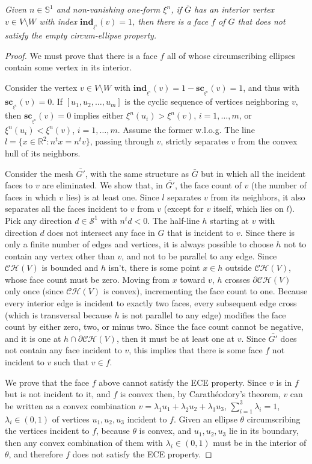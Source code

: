 \documentclass[11pt]{article}
\begin{document}
\emph{
Given $n\in\mathbb{S}^1$ and non-vanishing one-form $\xi^n$, if $\bar{G}$
has an interior vertex $v\in V\setminus W$ with index
$\mathbf{ind}_{_{\xi^n}}(v)=1$, then there is a face $f$ of
$G$ that does not satisfy the empty circum-ellipse property.  
}
\begin{proof}
We must prove that there is a face $f$ all of whose circumscribing ellipses
contain some vertex in its interior. 

Consider the vertex $v\in V\setminus W$ with
$\mathbf{ind}_{_{\xi^n}}(v)=1-\mathbf{sc}_{_{\xi^n}}(v)=1$, and thus
with $\mathbf{sc}_{_{\xi^n}}(v)=0$. If $\left[u_1,u_2,\dots,u_m\right]$ is the cyclic sequence of vertices neighboring
$v$, then 
$\mathbf{sc}_{_{\xi^n}}(v)=0$ implies either $\xi^n(u_i)>\xi^n(v)$, $i=1,\dots,m$, or $\xi^n(u_i)<\xi^n(v)$, $i=1,\dots,m$. 
Assume the former w.l.o.g. The line $l=\{x\in\mathbb{R}^2 : n^t x = n^t v\}$, passing through
$v$, strictly separates $v$ from the convex hull of its neighbors. 

Consider the mesh $\bar{G'}$, with the same structure as $\bar{G}$ but in which all the incident faces to $v$
are eliminated. 
We show that, in $\bar{G'}$, the face count of $v$ (the number of faces in which $v$ lies) is at
least one. 
Since $l$ separates $v$ from its neighbors, it also separates all the faces
incident to $v$ from $v$ (except for $v$ itself, which lies on $l$). 
Pick any direction $d\in\mathcal{S}^1$ with $n^t{d} < 0$. 
The half-line $h$ starting at $v$ with direction $d$ does not intersect any face in $G$ that is incident to $v$. 
Since there is only a finite number of edges and vertices, it is always
possible to choose $h$ not to contain any vertex other than $v$, and not to be parallel to any edge. 
Since $\mathcal{CH}(V)$ is bounded and $h$ isn't, there is
some point $x\in h$ outside $\mathcal{CH}(V)$, whose face count must be zero. 
Moving from $x$ toward $v$, $h$ crosses $\partial\mathcal{CH}(V)$ only once 
(since $\mathcal{CH}(V)$ is convex), incrementing the face count to one. 
Because every interior edge is incident to exactly two faces, 
every subsequent edge cross (which is transversal because $h$ is not
parallel to any edge) modifies the face count by either zero, two, or
minus two. Since the face count cannot be negative, and it is one at 
$h\cap \partial\mathcal{CH}(V)$, then it must be at least one at $v$. 
Since $\bar{G'}$ does not contain any face incident to $v$, 
this implies that there is
some face $f$ not incident to $v$ such that $v\in f$. 

We prove that the face $f$ above cannot satisfy the ECE property. 
Since $v$ is in $f$ but is not incident to it, and $f$ is convex
then, by Carath\'eodory's theorem, $v$ can be written as a 
convex combination $v=\lambda_1 u_1+\lambda_2 u_2+\lambda_3 u_3$,
$\sum_{i=1}^3\lambda_i=1$, $\lambda_i\in(0,1)$ of vertices $u_1,u_2,u_3$
incident to $f$. 
Given an ellipse $\theta$ circumscribing the vertices incident to $f$, 
because $\theta$ is convex, and $u_1,u_2,u_3$ lie in its boundary, 
then any convex combination of them with $\lambda_i\in(0,1)$ must be in the
interior of $\theta$, and therefore $f$ does not satisfy the ECE property. 
\end{proof}
\end{document}
